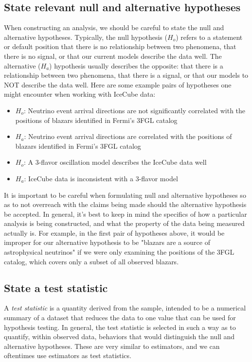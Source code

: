 \subsection{State relevant null and alternative hypotheses}
When constructing an analysis, we should be careful to state the null and alternative hypotheses. Typically, the null hypothesis ($H_o$) refers to a statement or default position that there is no relationship between two phenomena, that there is no signal, or that our current models describe the data well. The alternative ($H_a$) hypothesis usually describes the opposite: that there is a relationship between two phenomena, that there is a signal, or that our models to NOT describe the data well. Here are some example pairs of hypotheses one might encounter when working with IceCube data:

\begin{itemize}
    \item $H_o$: Neutrino event arrival directions are not significantly correlated with the positions of blazars identified in Fermi's 3FGL catalog
    \item $H_a$: Neutrino event arrival directions are correlated with the positions of blazars identified in Fermi's 3FGL catalog
\end{itemize}

\begin{itemize}
    \item $H_o$: A 3-flavor oscillation model describes the IceCube data well
    \item $H_a$: IceCube data is inconsistent with a 3-flavor model
\end{itemize}

It is important to be careful when formulating null and alternative hypotheses so as to not overreach with the claims being made should the alternative hypothesis be accepted. In general, it's best to keep in mind the specifics of how a particular analysis is being constructed, and what the property of the data being measured actually is. For example, in the first pair of hypotheses above, it would be improper for our alternative hypothesis to be "blazars are a source of astrophysical neutrinos" if we were only examining the positions of the 3FGL catalog, which covers only a subset of all observed blazars. 

\subsection{State a test statistic}
A \textit{test statistic} is a quantity derived from the sample, intended to be a numerical summary of a dataset that reduces the data to one value that can be used for hypothesis testing. In general, the test statistic is selected in such a way as to quantify, within observed data, behaviors that would distinguish the null and alternative hypotheses. These are very similar to estimators, and we can oftentimes use estimators as test statistics. 

